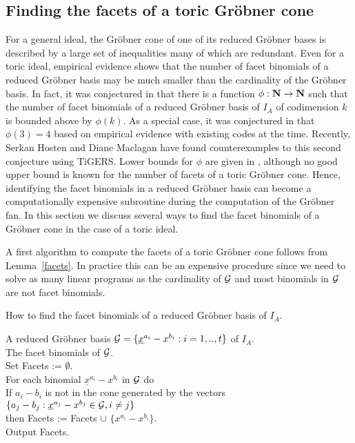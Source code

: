 \documentclass[11pt]{article}
\begin{document}
\subsection{Finding the facets of a toric Gr\"obner cone}

For a general ideal, the Gr\"obner cone of one of its reduced
Gr\"obner bases is described by a large set of inequalities many of
which are redundant. Even for a toric ideal, empirical evidence 
shows that the number of facet binomials of a reduced Gr\"obner basis may
be much smaller than the cardinality of the Gr\"obner basis. In fact,
it was conjectured in \cite{ST} that there is a function $\phi : {\bf
N} \rightarrow {\bf N}$ such that the number of facet binomials of a
reduced Gr\"obner basis of $I_A$ of codimension $k$ is bounded above
by $\phi(k)$. As a special case, it was conjectured in \cite{ST} that 
$\phi(3) = 4$ based on empirical evidence with existing codes at the  
time. Recently, Serkan Hosten and Diane Maclagan have found
counterexamples to this second conjecture using TiGERS. Lower bounds for
$\phi$ are given in \cite{ST}, although no good upper bound is known
for  the number of facets of a toric Gr\"obner cone. Hence,
identifying the facet binomials in a reduced Gr\"obner basis can
become a computationally expensive subroutine during the computation
of the Gr\"obner fan. In this section we discuss several ways to find
the facet binomials of a Gr\"obner cone in the case of a toric ideal. 

A first algorithm to compute the facets of a toric Gr\"obner cone 
follows from Lemma~\ref{facets}. In practice this
can be an expensive procedure since we need to solve as many linear 
programs as the cardinality of ${\cal G}$ and most binomials in ${\cal
G}$ are not facet binomials.

\begin{algorithm} How to find the facet binomials of a reduced
Gr\"obner basis of $I_A$. \label{second}
\end{algorithm}
 A reduced Gr\"obner basis ${\cal G} =
\{ {\underline x^{a_i}}-x^{b_i} :  i = 1,..,t \}$ of $I_A$.\\
 The facet binomials of ${\cal G}$.\\
\indent Set Facets := $\emptyset$.\\
\indent For each binomial ${\underline x^{a_i}}-x^{b_i}$ in ${\cal G}$
do \\
\indent \indent If $a_i - b_i$ is not in the cone generated
by the vectors $\{a_j - b_j : {\underline x^{a_j}}-x^{b_j} \in {\cal
G}, i \neq j \}$\\
\indent \indent then Facets := Facets $\cup$ $\{x^{a_i}-x^{b_i}\}$.\\
\indent Output Facets.\\
\end{document}
